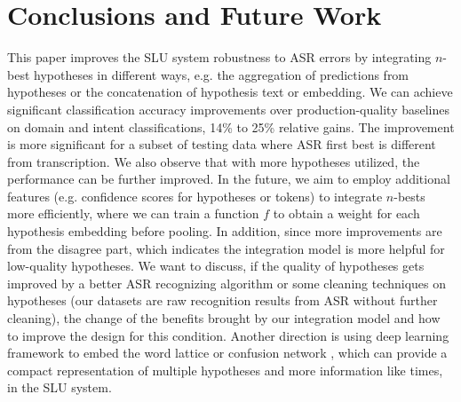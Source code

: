 \section{Conclusions and Future Work}
\label{speech:conclusion}
This paper improves the SLU system robustness to ASR errors by integrating $n$-best hypotheses in different ways, e.g. the aggregation of predictions from hypotheses or the concatenation of hypothesis text or embedding. 
We can achieve significant classification accuracy improvements over production-quality baselines on domain and intent classifications, 14\% to 25\% relative gains.  The improvement is more significant for a subset of testing data where ASR first best is different from transcription. We also observe that with more hypotheses utilized, the performance can be further improved. 
In the future, we aim to employ additional features (e.g. confidence scores for hypotheses or tokens) to integrate $n$-bests more efficiently, where we can train a function $f$ to obtain a weight for each hypothesis embedding before pooling. 
In addition, since more improvements are from the disagree part, which indicates the integration model is more helpful for low-quality hypotheses. We want to discuss, if the quality of hypotheses gets improved by a better ASR recognizing algorithm or some cleaning techniques on hypotheses (our datasets are raw recognition results from ASR without further cleaning), the change of the benefits brought by our integration model and how to improve the design for this condition.
Another direction is using deep learning framework to embed the word lattice \citep{liu2014efficient} or confusion network \citep{hakkani2006beyond, tur2002improving}, which can provide a compact representation of multiple hypotheses and more information like times, in the SLU system. 



